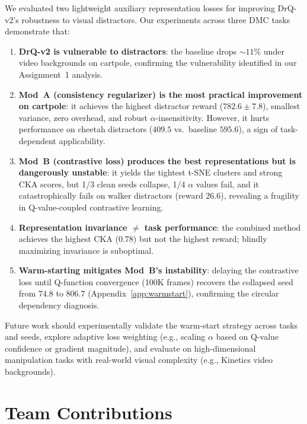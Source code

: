 \documentclass{article}
\begin{document}
We evaluated two lightweight auxiliary representation losses for improving DrQ-v2's robustness to visual distractors.
Our experiments across three DMC tasks demonstrate that:

\begin{enumerate}
  \item \textbf{DrQ-v2 is vulnerable to distractors}: the baseline drops ${\sim}11\%$ under video backgrounds on cartpole, confirming the vulnerability identified in our Assignment~1 analysis.
  \item \textbf{Mod~A (consistency regularizer) is the most practical improvement on cartpole}: it achieves the highest distractor reward ($782.6 \pm 7.8$), smallest variance, zero overhead, and robust $\alpha$-insensitivity. However, it hurts performance on cheetah distractors ($409.5$ vs.\ baseline $595.6$), a sign of task-dependent applicability.
  \item \textbf{Mod~B (contrastive loss) produces the best representations but is dangerously unstable}: it yields the tightest t-SNE clusters and strong CKA scores, but 1/3 clean seeds collapse, 1/4 $\alpha$ values fail, and it catastrophically fails on walker distractors (reward $26.6$), revealing a fragility in Q-value-coupled contrastive learning.
  \item \textbf{Representation invariance $\neq$ task performance}: the combined method achieves the highest CKA (0.78) but not the highest reward; blindly maximizing invariance is suboptimal.
  \item \textbf{Warm-starting mitigates Mod~B's instability}: delaying the contrastive loss until Q-function convergence (100K frames) recovers the collapsed seed from $74.8$ to $806.7$ (Appendix~\ref{app:warmstart}), confirming the circular dependency diagnosis.
\end{enumerate}

Future work should experimentally validate the warm-start strategy across tasks and seeds, explore adaptive loss weighting (e.g., scaling $\alpha$ based on Q-value confidence or gradient magnitude), and evaluate on high-dimensional manipulation tasks with real-world visual complexity (e.g., Kinetics video backgrounds).

\section{Team Contributions}
\label{sec:contributions}
\end{document}
